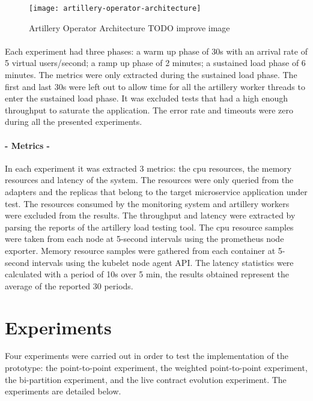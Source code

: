 \begin{figure}[htbp]
    \centering
    \texttt{[image: artillery-operator-architecture]}
    \caption{Artillery Operator Architecture TODO improve image}
    \label{fig:artilleryoperator}
\end{figure}

\paragraph{}

Each experiment had three phases:
a warm up phase of 30s with an arrival rate of 5 virtual users/second;
a ramp up phase of 2 minutes;
a sustained load phase of 6 minutes.
The metrics were only extracted during the sustained load phase.
The first and last 30s were left out to allow time for all the artillery worker threads to enter the sustained load phase.
It was excluded tests that had a high enough throughput to saturate the application.
The error rate and timeouts were zero during all the presented experiments.

\paragraph{- Metrics -}

In each experiment it was extracted 3 metrics: the cpu resources, the memory resources and latency of the system.
The resources were only queried from the adapters and the replicas that belong to the target microservice application under test.
The resources consumed by the monitoring system and artillery workers were excluded from the results.
The throughput and latency were extracted by parsing the reports of the artillery load testing tool.
The cpu resource samples were taken from each node at 5-second intervals using the prometheus node exporter.
Memory resource samples were gathered from each container at 5-second intervals using the kubelet node agent API.
The latency statistics were calculated with a period of 10s over 5 min, the results obtained represent the
average of the reported 30 periods.

\section{Experiments} %
\label{sec:experiments}

Four experiments were carried out in order to test the implementation of the prototype:
the point-to-point experiment, the weighted point-to-point experiment, the bi-partition experiment, and the live contract evolution experiment.
The experiments are detailed below.

